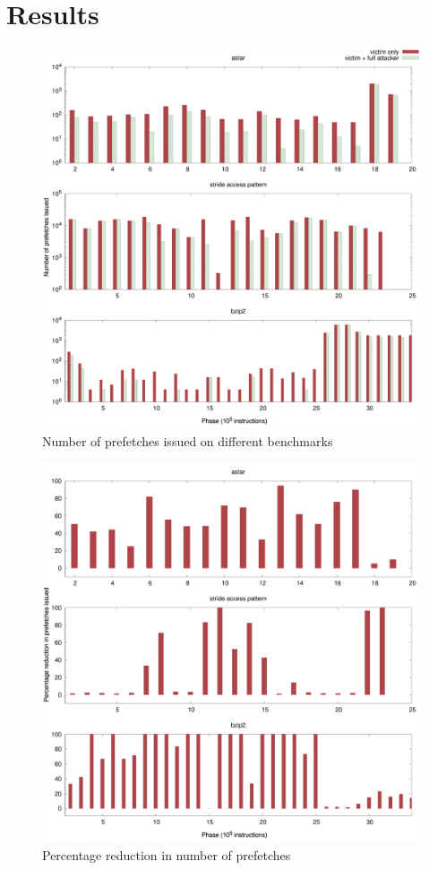 \documentclass[conference]{IEEEtran}
\begin{document}
\section{Results}

\begin{figure}[htbp]
    \centering
    \includegraphics[width=\columnwidth]{hwpf_num}
    \caption{Number of prefetches issued on different benchmarks}
    \label{fig:prefetch_attack}
\end{figure}

\begin{figure}[htbp]
    \centering
    \includegraphics[width=\columnwidth]{hwpf_perc}
    \caption{Percentage reduction in number of prefetches}
    \label{fig:prefetch_percred}
\end{figure}
\end{document}
